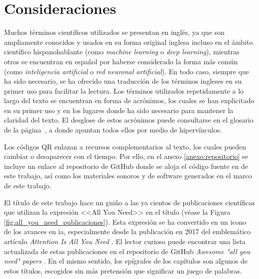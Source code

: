 \section{Consideraciones}


Muchos términos científicos utilizados se presentan en inglés, ya que son ampliamente conocidos y usados en su forma original inglesa incluso en el ámbito científico hispanohablante (como \emph{machine learning} o \emph{deep learning}), mientras otros se encuentran en español por haberse considerado la forma más común (como \emph{inteligencia artificial} o \emph{red neuronal artificial}). En todo caso, siempre que ha sido necesario, se ha ofrecido una traducción de los términos ingleses en su primer uso para facilitar la lectura. Los términos utilizados repetidamente a lo largo del texto se encuentran en forma de acrónimos, los cuales se han explicitado en su primer uso y en los lugares donde ha sido necesario para mantener la claridad del texto. El desglose de estos acrónimos puede consultarse en el glosario de la página~\pageref{chap:glosario}, a donde apuntan todos ellos por medio de hipervínculos.

Los códigos QR enlazan a recursos complementarios al texto, los cuales pueden cambiar o desaparecer con el tiempo. Por ello, en el anexo \ref{anexo:repositorio} se incluye un enlace al repositorio de GitHub donde se aloja el código fuente en  de este trabajo, así como los materiales sonoros y de software generados en el marco de este trabajo.

El título de este trabajo hace un guiño a las ya cientos de publicaciones científicas que utilizan la expresión <<All You Need>> en el título (véase la Figura \ref{fig:all_you_need_publicaciones}). Esta expresión se ha convertido en un icono de los avances en \gls{ia}, especialmente desde la publicación en 2017 del emblemático artículo \emph{Attention Is All You Need} \citep{vaswaniAttentionAllYou2017}. El lector curioso puede encontrar una lista actualizada de estas publicaciones en el repositorio de GitHub \emph{Awesome "all you need" papers} \citep{nishiKentoNishiAwesomeallyouneedpapers2024}. En el mismo sentido, los epígrafes de los capítulos son algunos de estos títulos, escogidos sin más pretensión que significar un juego de palabras.


